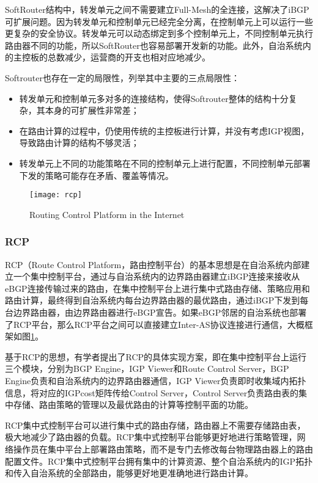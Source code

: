 SoftRouter结构中，转发单元之间不需要建立Full-Mesh的全连接，这解决了iBGP可扩展问题。因为转发单元和控制单元已经完全分离，在控制单元上可以运行一些更复杂的安全协议。转发单元可以动态绑定到多个控制单元上，不同控制单元执行路由器不同的功能，所以SoftRouter也容易部署开发新的功能。此外，自治系统内的主控板的总数减少，运营商的开支也相对应地减少。

Softrouter也存在一定的局限性，列举其中主要的三点局限性：
\begin{itemize}
  \item 转发单元和控制单元多对多的连接结构，使得Softrouter整体的结构十分复杂，其本身的可扩展性非常差；
  \item 在路由计算的过程中，仍使用传统的主控板进行计算，并没有考虑IGP视图，导致路由计算的结构不够灵活；
  \item 转发单元上不同的功能策略在不同的控制单元上进行配置，不同控制单元部署下发的策略可能存在矛盾、覆盖等情况。
\end{itemize}

\begin{figure}
  \centering
  \texttt{[image: rcp]}
  \caption{Routing Control Platform in the Internet\cite{Feamster2004The}}
  \label{fig:rcp}
\end{figure}

\subsubsection{RCP\cite{Feamster2004The}}
RCP（Route Control Platform，路由控制平台）的基本思想是在自治系统内部建立一个集中控制平台，通过与自治系统内的边界路由器建立iBGP连接来接收从eBGP连接传输过来的路由，在集中控制平台上进行集中式路由存储、策略应用和路由计算，最终得到自治系统内每台边界路由器的最优路由，通过iBGP下发到每台边界路由器，由边界路由器进行eBGP宣告。如果eBGP邻居的自治系统也部署了RCP平台，那么RCP平台之间可以直接建立Inter-AS协议连接进行通信，大概框架如图\ref{fig:rcp}。

基于RCP的思想，有学者提出了RCP的具体实现方案\cite{Caldwell2005Design}，即在集中控制平台上运行三个模块，分别为BGP Engine，IGP Viewer和Route Control Server，BGP Engine负责和自治系统内的边界路由器通信，IGP Viewer负责即时收集域内拓扑信息，将对应的IGPcost矩阵传给Control Server，Control Server负责路由表的集中存储、路由策略的管理以及最优路由的计算等控制平面的功能。

RCP集中式控制平台可以进行集中式的路由存储，路由器上不需要存储路由表，极大地减少了路由器的负载。RCP集中式控制平台能够更好地进行策略管理，网络操作员在集中平台上部署路由策略，而不是专门去修改每台物理路由器上的路由配置文件。RCP集中式控制平台拥有集中的计算资源、整个自治系统内的IGP拓扑和传入自治系统的全部路由，能够更好地更准确地进行路由计算。

